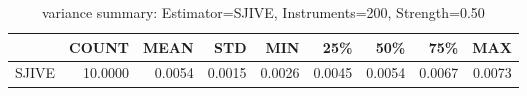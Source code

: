 \begin{table}[ht]
\centering
\caption{variance summary: Estimator=SJIVE, Instruments=200, Strength=0.50}
\begin{tabular}{lrrrrrrrr}
\toprule
 & COUNT & MEAN & STD & MIN & 25\% & 50\% & 75\% & MAX \\
\midrule
SJIVE & 10.0000 & 0.0054 & 0.0015 & 0.0026 & 0.0045 & 0.0054 & 0.0067 & 0.0073 \\
\bottomrule
\end{tabular}
\end{table}
